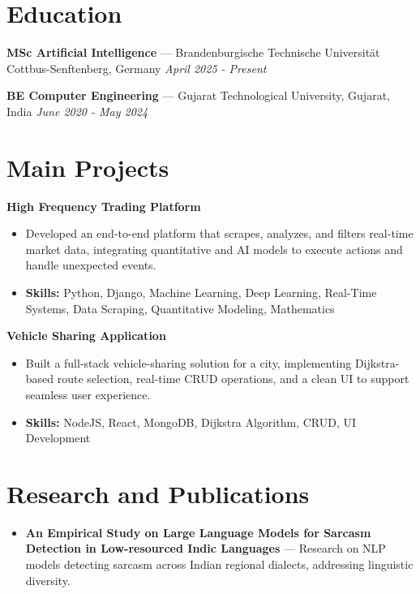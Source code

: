 \documentclass[a4paper,10pt]{article}
\begin{document}
\section*{Education}
\textbf{MSc Artificial Intelligence} — Brandenburgische Technische Universität Cottbus-Senftenberg, Germany \hfill \textit{April 2025 - Present}\par
\vspace{1.5pt}
\textbf{BE Computer Engineering} — Gujarat Technological University, Gujarat, India \hfill \textit{June 2020 - May 2024}\par

\section*{Main Projects}
\textbf{High Frequency Trading Platform}\par
\vspace{1pt}
\begin{itemize}
  \item Developed an end-to-end platform that scrapes, analyzes, and filters real-time market data, integrating quantitative and AI models to execute actions and handle unexpected events.
  \item \textbf{Skills:} Python, Django, Machine Learning, Deep Learning, Real-Time Systems, Data Scraping, Quantitative Modeling, Mathematics
\end{itemize}
\vspace{3pt}
\textbf{Vehicle Sharing Application}\par
\vspace{1pt}
\begin{itemize}
  \item Built a full-stack vehicle-sharing solution for a city, implementing Dijkstra-based route selection, real-time CRUD operations, and a clean UI to support seamless user experience.
  \item \textbf{Skills:} NodeJS, React, MongoDB, Dijkstra Algorithm, CRUD, UI Development
\end{itemize}

\section*{Research and Publications}
\begin{itemize}
\item \textbf{An Empirical Study on Large Language Models for Sarcasm Detection in Low-resourced Indic Languages} — Research on NLP models detecting sarcasm across Indian regional dialects, addressing linguistic diversity.
\end{itemize}
\end{document}
